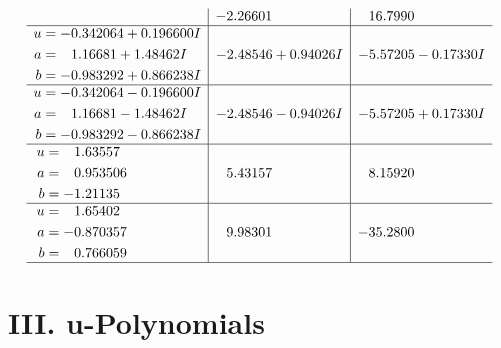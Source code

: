 \documentclass[1p]{elsarticle_modified}
\theoremstyle{definition}
\begin{document}
$$\begin{array}{c|c|c}
 & -2.26601\phantom{ +0.000000I} & \phantom{-}16.7990\phantom{ +0.000000I} \\ \hline\begin{aligned}
u &= -0.342064 + 0.196600 I \\
a &= \phantom{-}1.16681 + 1.48462 I \\
b &= -0.983292 + 0.866238 I\end{aligned}
 & -2.48546 + 0.94026 I & -5.57205 - 0.17330 I \\ \hline\begin{aligned}
u &= -0.342064 - 0.196600 I \\
a &= \phantom{-}1.16681 - 1.48462 I \\
b &= -0.983292 - 0.866238 I\end{aligned}
 & -2.48546 - 0.94026 I & -5.57205 + 0.17330 I \\ \hline\begin{aligned}
u &= \phantom{-}1.63557\phantom{ +0.000000I} \\
a &= \phantom{-}0.953506\phantom{ +0.000000I} \\
b &= -1.21135\phantom{ +0.000000I}\end{aligned}
 & \phantom{-}5.43157\phantom{ +0.000000I} & \phantom{-}8.15920\phantom{ +0.000000I} \\ \hline\begin{aligned}
u &= \phantom{-}1.65402\phantom{ +0.000000I} \\
a &= -0.870357\phantom{ +0.000000I} \\
b &= \phantom{-}0.766059\phantom{ +0.000000I}\end{aligned}
 & \phantom{-}9.98301\phantom{ +0.000000I} & -35.2800\phantom{ +0.000000I}\\
 \hline 
 \end{array}$$\newpage
\newpage\renewcommand{\arraystretch}{1}
\centering \section*{ III. u-Polynomials}
\end{document}
